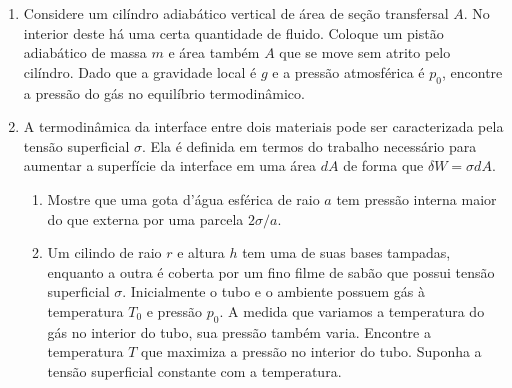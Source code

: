 \begin{enumerate}
    \item
        Considere um cilíndro adiabático vertical de área de seção transfersal
        $A$. No interior deste há uma certa quantidade de fluido. Coloque um
        pistão adiabático de massa $m$ e área também $A$ que se move sem atrito
        pelo cilíndro. Dado que a gravidade local é $g$ e a pressão atmosférica
        é $p_0$, encontre a pressão do gás no equilíbrio termodinâmico.

    \item
        A termodinâmica da interface entre dois materiais pode ser caracterizada
        pela tensão superficial $\sigma$. Ela é definida em termos do trabalho
        necessário para aumentar a superfície da interface em uma área $dA$
        de forma que $\delta W=\sigma dA$. 
        \begin{enumerate}
            \item
                Mostre que uma gota d'água esférica de raio $a$ tem pressão
                interna maior do que externa por uma parcela $2\sigma/a$. 
            \item
                Um cilindo de raio $r$ e altura $h$ tem uma de suas bases
                tampadas, enquanto a outra é coberta por um fino filme de sabão
                que possui tensão superficial $\sigma$. Inicialmente o tubo e o
                ambiente possuem gás à temperatura $T_0$ e pressão $p_0$. A
                medida que variamos a temperatura do gás no interior do tubo,
                sua pressão também varia. Encontre a temperatura $T$ que
                maximiza a pressão no interior do tubo. Suponha a tensão
                superficial constante com a temperatura.
        \end{enumerate}
\end{enumerate}
